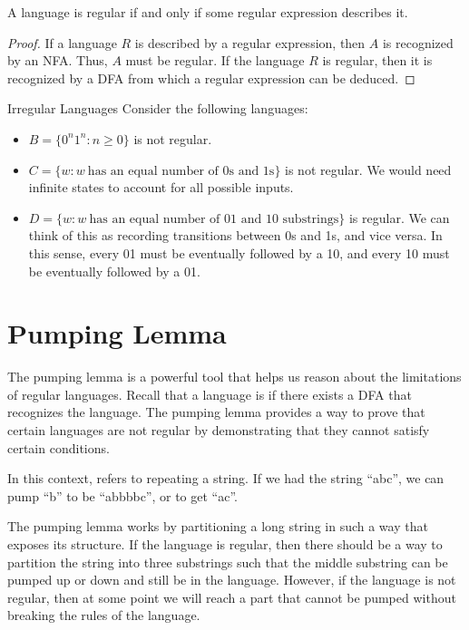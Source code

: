 \documentclass[math]{amznotes}
\begin{document}
\begin{thmbox}{}{}
    A language is regular if and only if some regular expression describes it.
    \tcblower
    \begin{proof}
        If a language $R$ is described by a regular expression, then $A$ is recognized by an NFA. Thus, $A$ must be regular. If the language $R$ is regular, then it is recognized by a DFA from which a regular expression can be deduced.
    \end{proof}
\end{thmbox}

\begin{exbox}{Irregular Languages}{}
    Consider the following languages:
    \begin{itemize}[noitemsep]
        \item $B = \{ 0^n 1^n : n \geq 0\}$ is not regular.
        \item $C = \{ w : w\ \text{has an equal number of 0s and 1s} \}$ is not regular. We would need infinite states to account for all possible inputs.
        \item $D = \{ w : w\ \text{has an equal number of 01 and 10 substrings} \}$ is regular. We can think of this as recording transitions between 0s and 1s, and vice versa. In this sense, every 01 must be eventually followed by a 10, and every 10 must be eventually followed by a 01.
    \end{itemize}
\end{exbox}

\section{Pumping Lemma}
The pumping lemma is a powerful tool that helps us reason about the limitations of regular languages. Recall that a language is  if there exists a DFA that recognizes the language. The pumping lemma provides a way to prove that certain languages are not regular by demonstrating that they cannot satisfy certain conditions.

\begin{notebox}
    In this context,  refers to repeating a string. If we had the string ``abc'', we can pump ``b'' to be ``abbbbc'', or  to get ``ac''.
\end{notebox}

The pumping lemma works by partitioning a long string in such a way that exposes its structure. If the language is regular, then there should be a way to partition the string into three substrings such that the middle substring can be pumped up or down and still be in the language. However, if the language is not regular, then at some point we will reach a part that cannot be pumped without breaking the rules of the language.
\end{document}
